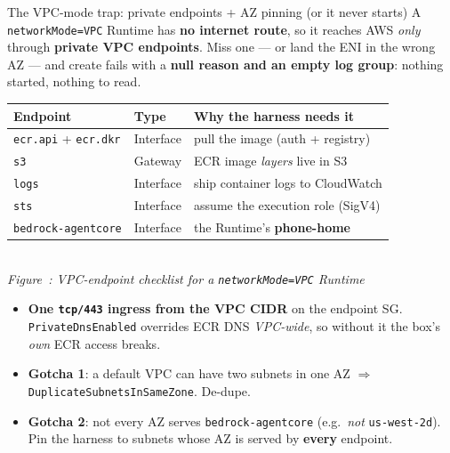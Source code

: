 \documentclass[aspectratio=169]{beamer}
\newcounter{deckfig}
\newcommand{\figtag}[1]{\refstepcounter{deckfig}%
  {\scriptsize\itshape Figure~\thedeckfig: #1}}
\begin{document}
\begin{frame}{The VPC-mode trap: private endpoints + AZ pinning (or it never starts)}
  \footnotesize A \texttt{networkMode=VPC} Runtime has \textbf{no internet route}, so it reaches AWS
  \emph{only} through \textbf{private VPC endpoints}. Miss one --- or land the ENI in the wrong AZ ---
  and create fails with a \textbf{null reason and an empty log group}: nothing started, nothing to read.
  \vspace{0.2em}
  \begin{center}\scriptsize
  \begin{tabular}{@{}p{3.1cm}p{2.0cm}p{5.4cm}@{}}
    \toprule
    \textbf{Endpoint} & \textbf{Type} & \textbf{Why the harness needs it} \\
    \midrule
    \texttt{ecr.api} + \texttt{ecr.dkr} & Interface & pull the image (auth + registry) \\
    \texttt{s3} & Gateway & ECR image \emph{layers} live in S3 \\
    \texttt{logs} & Interface & ship container logs to CloudWatch \\
    \texttt{sts} & Interface & assume the execution role (SigV4) \\
    \texttt{bedrock-agentcore} & Interface & the Runtime's \textbf{phone-home} \\
    \bottomrule
  \end{tabular}
  \\[0.1em]\figtag{VPC-endpoint checklist for a \texttt{networkMode=VPC} Runtime}
  \end{center}
  \vspace{0.2em}
  \begin{itemize}\setlength\itemsep{0.1em}
    \item \textbf{One \texttt{tcp/443} ingress from the VPC CIDR} on the endpoint SG.
      \texttt{PrivateDnsEnabled} overrides ECR DNS \emph{VPC-wide}, so without it the box's \emph{own}
      ECR access breaks.
    \item \textbf{Gotcha 1}: a default VPC can have two subnets in one AZ $\Rightarrow$
      \texttt{DuplicateSubnetsInSameZone}. De-dupe.
    \item \textbf{Gotcha 2}: not every AZ serves \texttt{bedrock-agentcore} (e.g.\ \emph{not}
      \texttt{us-west-2d}). Pin the harness to subnets whose AZ is served by \textbf{every} endpoint.
  \end{itemize}
\end{frame}
\end{document}

